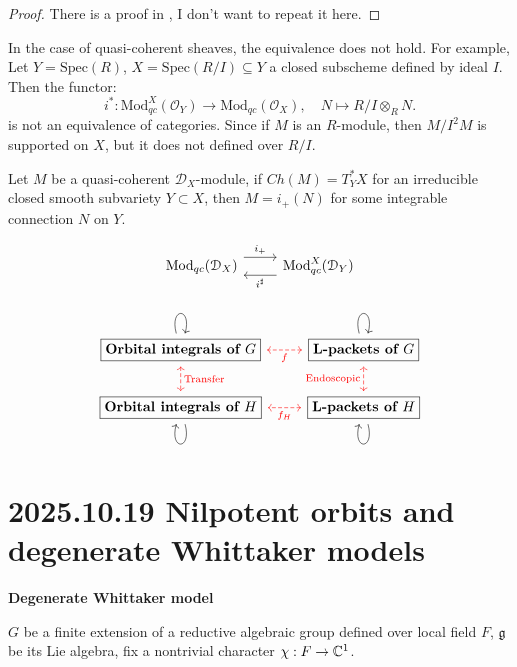 \documentclass[12pt]{amsart}
\numberwithin{equation}{section}
\newcommand{\fg}{\mathfrak{g}} \newcommand{\fh}{\mathfrak{h}} \newcommand{\fk}{\mathfrak{k}}
\begin{document}
\begin{proof}
  There is a proof in \cite{HTT08}, I don't want to repeat it here.  
\end{proof}

\begin{rk}
  In the case of quasi-coherent sheaves, the equivalence does not hold. For example, Let $Y = \mathrm{Spec}(R)$, $X = \mathrm{Spec}(R/I) \subseteq Y$ a closed subscheme defined by ideal $I$. Then the functor:
  \[i^* : \mathrm{Mod}^X_{qc}(\mathcal{O}_Y) \to \mathrm{Mod}_{qc}(\mathcal{O}_X), \quad N \mapsto R/I \otimes_R N.\]
  is not an equivalence of categories. Since if $M$ is an $R$-module, then $M/I^2M$ is supported on $X$, but it does not defined over $R/I$.
\end{rk}

\begin{cor}
  Let $M$ be a quasi-coherent $\mathcal{D}_X$-module, if $Ch(M) = T^*_{Y}X$ for an irreducible closed smooth subvariety $Y \subset X$, then $M = i_+(N)$ for some integrable connection $N$ on $Y$.
\end{cor}

\[
\begin{tikzcd}
  \mathrm{Mod}_{qc}(\mathcal{D}_X) \arrow[r,shift left=1.5ex,"i_+"] & \mathrm{Mod}^X_{qc}(\mathcal{D}_Y) \arrow[l,shift left=1.5ex,"i^{\sharp}"]
\end{tikzcd}
\]



\[
\begin{tikzcd}
  \boxed{\textbf{Orbital integrals of $G$}} \arrow[loop above,]{r} \arrow[red,d,dashed,leftrightarrow,"\mathrm{Transfer}"] & \boxed{\textbf{L-packets of $G$}} \arrow[red,l,leftrightarrow,dashed,"f"] \arrow[loop above]{l}\\
  \boxed{\textbf{Orbital integrals of $H$}} \arrow[loop below]{r} & \boxed{\textbf{L-packets of $H$}} \arrow[red,l,leftrightarrow,dashed,"f_H"] \arrow[loop below]{l}
  \arrow[red,u,leftrightarrow,dashed,"{\mathrm{Endoscopic}}"]
\end{tikzcd}
\]



\section{2025.10.19 Nilpotent orbits and degenerate Whittaker models}
\textbf{Degenerate Whittaker model}

$G$ be a finite extension of a reductive algebraic group defined over local field $F$, $\fg$ be its Lie algebra, fix a nontrivial character $\chi: F \to {\mathbb {C}}^1$. 
\end{document}
